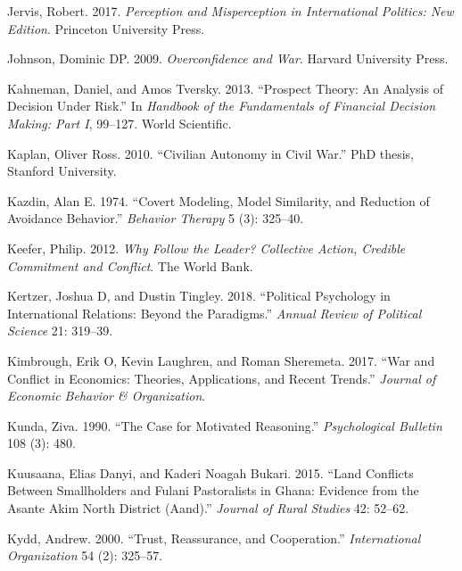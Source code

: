 \documentclass[11pt]{article}
\begin{document}
\leavevmode\hypertarget{ref-jervis2017perception}{}%
Jervis, Robert. 2017. \emph{Perception and Misperception in
International Politics: New Edition}. Princeton University Press.

\leavevmode\hypertarget{ref-johnson2009overconfidence}{}%
Johnson, Dominic DP. 2009. \emph{Overconfidence and War}. Harvard
University Press.

\leavevmode\hypertarget{ref-kahneman2013prospect}{}%
Kahneman, Daniel, and Amos Tversky. 2013. ``Prospect Theory: An Analysis
of Decision Under Risk.'' In \emph{Handbook of the Fundamentals of
Financial Decision Making: Part I}, 99--127. World Scientific.

\leavevmode\hypertarget{ref-kaplan2010civilian}{}%
Kaplan, Oliver Ross. 2010. ``Civilian Autonomy in Civil War.''
PhD thesis, Stanford University.

\leavevmode\hypertarget{ref-kazdin1974covertModeling}{}%
Kazdin, Alan E. 1974. ``Covert Modeling, Model Similarity, and Reduction
of Avoidance Behavior.'' \emph{Behavior Therapy} 5 (3): 325--40.

\leavevmode\hypertarget{ref-keefer2012follow}{}%
Keefer, Philip. 2012. \emph{Why Follow the Leader? Collective Action,
Credible Commitment and Conflict}. The World Bank.

\leavevmode\hypertarget{ref-kertzer2018political}{}%
Kertzer, Joshua D, and Dustin Tingley. 2018. ``Political Psychology in
International Relations: Beyond the Paradigms.'' \emph{Annual Review of
Political Science} 21: 319--39.

\leavevmode\hypertarget{ref-kimbrough2017war}{}%
Kimbrough, Erik O, Kevin Laughren, and Roman Sheremeta. 2017. ``War and
Conflict in Economics: Theories, Applications, and Recent Trends.''
\emph{Journal of Economic Behavior \& Organization}.

\leavevmode\hypertarget{ref-kunda1990motivatedReasoning}{}%
Kunda, Ziva. 1990. ``The Case for Motivated Reasoning.''
\emph{Psychological Bulletin} 108 (3): 480.

\leavevmode\hypertarget{ref-kuusaana2015land}{}%
Kuusaana, Elias Danyi, and Kaderi Noagah Bukari. 2015. ``Land Conflicts
Between Smallholders and Fulani Pastoralists in Ghana: Evidence from the
Asante Akim North District (Aand).'' \emph{Journal of Rural Studies} 42:
52--62.

\leavevmode\hypertarget{ref-kydd2000trust}{}%
Kydd, Andrew. 2000. ``Trust, Reassurance, and Cooperation.''
\emph{International Organization} 54 (2): 325--57.
\end{document}

